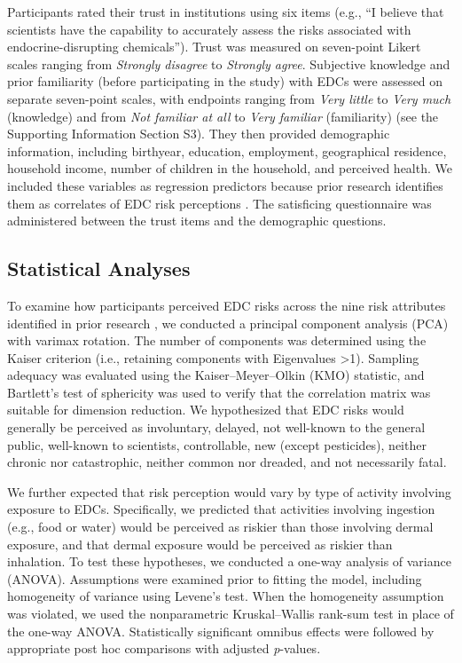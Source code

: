 Participants rated their trust in institutions using six items (e.g., “I believe that scientists have the capability to accurately assess the risks associated with endocrine-disrupting chemicals”). Trust was measured on seven-point Likert scales ranging from \textit{Strongly disagree} to \textit{Strongly agree}. Subjective knowledge and prior familiarity (before participating in the study) with EDCs were assessed on separate seven-point scales, with endpoints ranging from \textit{Very little} to \textit{Very much} (knowledge) and from \textit{Not familiar at all} to \textit{Very familiar} (familiarity) (see the Supporting Information Section S3). They then provided demographic information, including birthyear, education, employment, geographical residence, household income, number of children in the household, and perceived health. We included these variables as regression predictors because prior research identifies them as correlates of EDC risk perceptions \citep{pravednikov2024main}. The satisficing questionnaire \citep{berry2022drivers} was administered between the trust items and the demographic questions.


\subsection{Statistical Analyses}
To examine how participants perceived EDC risks across the nine risk attributes identified in prior research \citep{fischhoff1978safe}, we conducted a principal component analysis (PCA) with varimax rotation. The number of components was determined using the Kaiser criterion (i.e., retaining components with Eigenvalues >1). Sampling adequacy was evaluated using the Kaiser--Meyer--Olkin (KMO) statistic, and Bartlett's test of sphericity was used to verify that the correlation matrix was suitable for dimension reduction. We hypothesized that EDC risks would generally be perceived as involuntary, delayed, not well-known to the general public, well-known to scientists, controllable, new (except pesticides), neither chronic nor catastrophic, neither common nor dreaded, and not necessarily fatal.

We further expected that risk perception would vary by type of activity involving exposure to EDCs. Specifically, we predicted that activities involving ingestion (e.g., food or water) would be perceived as riskier than those involving dermal exposure, and that dermal exposure would be perceived as riskier than inhalation. To test these hypotheses, we conducted a one-way analysis of variance (ANOVA). Assumptions were examined prior to fitting the model, including homogeneity of variance using Levene's test. When the homogeneity assumption was violated, we used the nonparametric Kruskal--Wallis rank-sum test in place of the one-way ANOVA. Statistically significant omnibus effects were followed by appropriate post hoc comparisons with adjusted \textit{p}-values.

